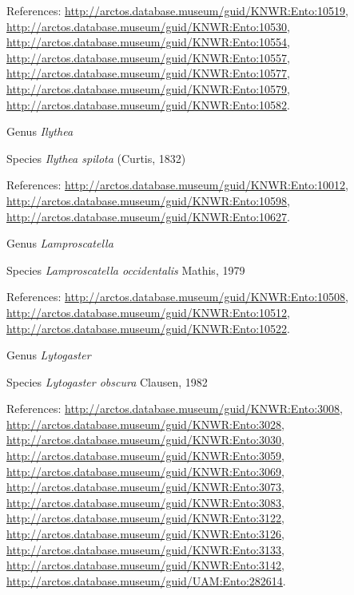 \documentclass[9pt, article]{memoir}
\begin{document}
\begin{multicols}{2}
\vspace{6pt}References: 
\url{http://arctos.database.museum/guid/KNWR:Ento:10519}, 
\url{http://arctos.database.museum/guid/KNWR:Ento:10530}, 
\url{http://arctos.database.museum/guid/KNWR:Ento:10554}, 
\url{http://arctos.database.museum/guid/KNWR:Ento:10557}, 
\url{http://arctos.database.museum/guid/KNWR:Ento:10577}, 
\url{http://arctos.database.museum/guid/KNWR:Ento:10579}, 
\url{http://arctos.database.museum/guid/KNWR:Ento:10582}.

\vspace{6pt}\noindent\hspace{30pt}Genus \textit{Ilythea}


\vspace{6pt}\noindent\hspace{36pt}Species \textit{Ilythea spilota} (Curtis, 1832)


\vspace{6pt}References: 
\url{http://arctos.database.museum/guid/KNWR:Ento:10012}, 
\url{http://arctos.database.museum/guid/KNWR:Ento:10598}, 
\url{http://arctos.database.museum/guid/KNWR:Ento:10627}.

\vspace{6pt}\noindent\hspace{30pt}Genus \textit{Lamproscatella}


\vspace{6pt}\noindent\hspace{36pt}Species \textit{Lamproscatella occidentalis} Mathis, 1979


\vspace{6pt}References: 
\url{http://arctos.database.museum/guid/KNWR:Ento:10508}, 
\url{http://arctos.database.museum/guid/KNWR:Ento:10512}, 
\url{http://arctos.database.museum/guid/KNWR:Ento:10522}.

\vspace{6pt}\noindent\hspace{30pt}Genus \textit{Lytogaster}


\vspace{6pt}\noindent\hspace{36pt}Species \textit{Lytogaster obscura} Clausen, 1982


\vspace{6pt}References: 
\url{http://arctos.database.museum/guid/KNWR:Ento:3008}, 
\url{http://arctos.database.museum/guid/KNWR:Ento:3028}, 
\url{http://arctos.database.museum/guid/KNWR:Ento:3030}, 
\url{http://arctos.database.museum/guid/KNWR:Ento:3059}, 
\url{http://arctos.database.museum/guid/KNWR:Ento:3069}, 
\url{http://arctos.database.museum/guid/KNWR:Ento:3073}, 
\url{http://arctos.database.museum/guid/KNWR:Ento:3083}, 
\url{http://arctos.database.museum/guid/KNWR:Ento:3122}, 
\url{http://arctos.database.museum/guid/KNWR:Ento:3126}, 
\url{http://arctos.database.museum/guid/KNWR:Ento:3133}, 
\url{http://arctos.database.museum/guid/KNWR:Ento:3142}, 
\url{http://arctos.database.museum/guid/UAM:Ento:282614}.


\end{multicols}
\end{document}
